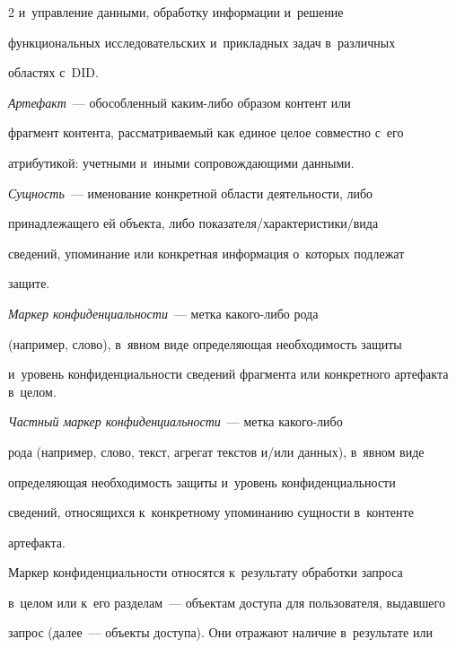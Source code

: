 \begin{multicols}{2}
и~управ\-ле\-ние данными, обработку информации и~решение 


функциональных исследовательских и~прикладных задач в~различных 


областях с~DID. 


  


  \textit{Артефакт}~--- обособленный каким-либо образом контент или 


фрагмент контента, рас\-смат\-ри\-ва\-емый как единое целое совместно с~его 


атрибутикой: учетными и~иными сопровождающими данными. 


  


  \textit{Сущность}~--- именование конкретной области деятельности, либо 


принадлежащего ей объекта, либо по\-ка\-за\-те\-ля/ха\-рак\-те\-ри\-сти\-ки/ви\-да 


сведений, упоминание или конкретная информация о~которых подлежат 


защите.


  


  \textit{Маркер конфиденциальности}~--- метка ка\-ко\-го-либо рода 


(например, слово), в~явном виде определяющая необходимость защиты 


и~уровень конфиденциальности сведений фрагмента или \mbox{конкретного} артефакта в~целом.


  


  \textit{Частный маркер конфиденциальности}~--- метка какого-ли\-бо 


рода (например, слово, текст, агрегат текстов и/или данных), в~явном виде 


опре\-деляющая необходимость защиты и~уровень конфиденциальности 


сведений, относящихся к~{конкретному} упоминанию сущности в~контенте 


артефакта.


  


  Маркер конфиденциальности  относятся к~результату обработки запроса 


  в~целом или к~его разделам~--- объектам доступа для пользователя, выдавшего 


запрос (далее~--- объекты доступа). Они отражают наличие в~результате или 



\end{multicols}
